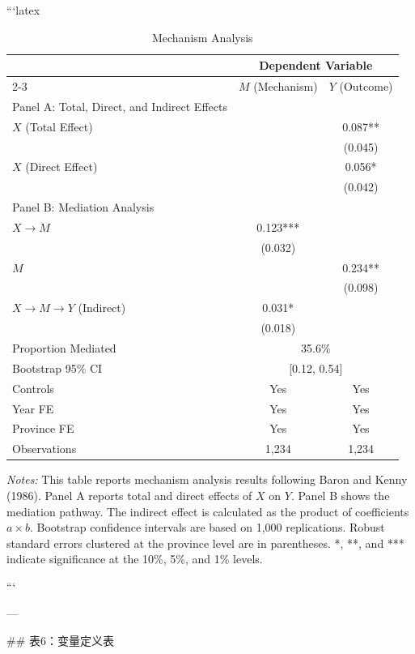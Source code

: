 ```latex
\begin{table}[htbp]
\centering
\caption{Mechanism Analysis}
\label{tab:mechanism}
\scriptsize
\begin{tabular}{lcc}
\toprule
 & \multicolumn{2}{c}{Dependent Variable} \\
\cmidrule(lr){2-3}
 & $M$ (Mechanism) & $Y$ (Outcome) \\
\midrule
Panel A: Total, Direct, and Indirect Effects \\
$X$ (Total Effect) & & 0.087** \\
 & & (0.045) \\
$X$ (Direct Effect) & & 0.056* \\
 & & (0.042) \\
\midrule
Panel B: Mediation Analysis \\
$X \rightarrow M$ & 0.123*** & \\
 & (0.032) & \\
$M$ & & 0.234** \\
 & & (0.098) \\
$X \rightarrow M \rightarrow Y$ (Indirect) & 0.031* & \\
 & (0.018) & \\
\midrule
Proportion Mediated & \multicolumn{2}{c}{35.6\%} \\
Bootstrap 95\% CI & \multicolumn{2}{c}{[0.12, 0.54]} \\
\midrule
Controls & Yes & Yes \\
Year FE & Yes & Yes \\
Province FE & Yes & Yes \\
\midrule
Observations & 1,234 & 1,234 \\
\bottomrule
\end{tabular}
\begin{minipage}{\linewidth}
\smallskip
\textit{Notes:} This table reports mechanism analysis results following Baron and Kenny (1986). Panel A reports total and direct effects of $X$ on $Y$. Panel B shows the mediation pathway. The indirect effect is calculated as the product of coefficients $a \times b$. Bootstrap confidence intervals are based on 1,000 replications. Robust standard errors clustered at the province level are in parentheses. *, **, and *** indicate significance at the 10\%, 5\%, and 1\% levels.
\end{minipage}
\end{table}
```

---

## 表6：变量定义表


